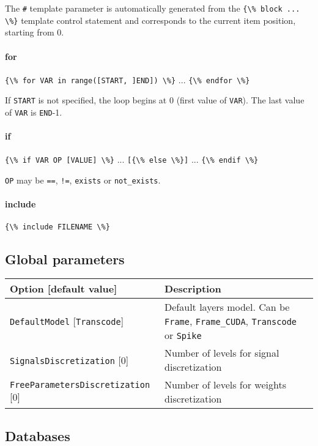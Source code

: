 \documentclass[a4paper,11pt,oneside]{article}
\begin{document}
The \lstinline!#! template parameter is automatically generated from the
\lstinline!{\% block ... \%}! template control statement and corresponds to the
current item position, starting from 0.

\paragraph{for}
\lstinline!{\% for VAR in range([START, ]END]) \%}! ...
\lstinline!{\% endfor \%}!

If \lstinline!START! is not specified, the loop begins at 0 (first value of
\lstinline!VAR!). The last value of \lstinline!VAR! is \lstinline!END!-1.

\paragraph{if}
\lstinline!{\% if VAR OP [VALUE] \%}! ...
\lstinline![{\% else \%}]! ...
\lstinline!{\% endif \%}!

\lstinline!OP! may be \lstinline!==!, \lstinline?!=?, \lstinline!exists! or \lstinline!not_exists!.

\paragraph{include}
\lstinline!{\% include FILENAME \%}!


\subsection{Global parameters}

\begin{center}
 \begin{tabular}{| p{5cm} | p{10cm} | }
 \hline
 Option [default value] & Description\\
 \hline\hline
  \lstinline!DefaultModel! [\lstinline!Transcode!] & Default layers model.
  Can be \lstinline!Frame!, \lstinline!Frame_CUDA!, \lstinline!Transcode!
  or \lstinline!Spike! \\
  \lstinline!SignalsDiscretization! [0] & Number of levels for signal
  discretization \\
  \lstinline!FreeParametersDiscretization! [0] & Number of levels for weights discretization \\
 \hline
\end{tabular}
\end{center}


\subsection{Databases}
\end{document}
